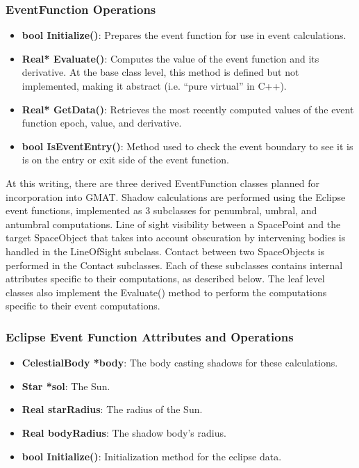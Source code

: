 \documentclass[letterpaper,10pt]{article}
\begin{document}
\subsubsection{EventFunction Operations}

\begin{itemize}
\item \textbf{bool Initialize()}: Prepares the event function for use in event
calculations.
\item \textbf{Real* Evaluate()}: Computes the value of the event function and
its derivative.  At the base class level, this method is defined but not
implemented, making it abstract (i.e. ``pure virtual'' in C++).
\item \textbf{Real* GetData()}: Retrieves the most recently computed values of
the event function epoch, value, and derivative.
\item \textbf{bool IsEventEntry()}: Method used to check the event boundary to
see it is is on the entry or exit side of the event function.
\end{itemize}

At this writing, there are three derived EventFunction classes planned for
incorporation into GMAT.  Shadow calculations are performed using the Eclipse
event functions, implemented as 3 subclasses for penumbral, umbral, and
antumbral computations.  Line of sight visibility between a SpacePoint and the
target SpaceObject that takes into account obscuration by intervening bodies is
handled in the LineOfSight subclass. Contact between two SpaceObjects is
performed in the Contact subclasses.  Each of these subclasses contains internal
attributes specific to their computations, as described below.  The leaf level
classes also implement the Evaluate() method to perform the computations
specific to their event computations.  

\subsubsection{Eclipse Event Function Attributes and Operations}

\begin{itemize}
\item \textbf{CelestialBody *body}:  The body casting shadows for these
calculations.
\item \textbf{Star *sol}: The Sun.
\item \textbf{Real starRadius}:  The radius of the Sun.
\item \textbf{Real bodyRadius}:  The shadow body's radius.
\item \textbf{bool Initialize()}: Initialization method for the eclipse data.
\end{itemize}
\end{document}
